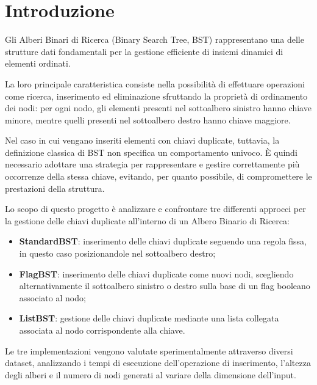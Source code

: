 \documentclass[a4paper,12pt]{article}
\begin{document}
\tableofcontents

\newpage

\section{Introduzione}

Gli Alberi Binari di Ricerca (Binary Search Tree, BST) rappresentano una delle strutture dati fondamentali per la gestione efficiente di insiemi dinamici di elementi ordinati.

La loro principale caratteristica consiste nella possibilità di effettuare operazioni come ricerca, inserimento ed eliminazione sfruttando la proprietà di ordinamento dei nodi: per ogni nodo, gli elementi presenti nel sottoalbero sinistro hanno chiave minore, mentre quelli presenti nel sottoalbero destro hanno chiave maggiore.

Nel caso in cui vengano inseriti elementi con chiavi duplicate, tuttavia, la definizione classica di BST non specifica un comportamento univoco. È quindi necessario adottare una strategia per rappresentare e gestire correttamente più occorrenze della stessa chiave, evitando, per quanto possibile, di compromettere le prestazioni della struttura.

Lo scopo di questo progetto è analizzare e confrontare tre differenti approcci per la gestione delle chiavi duplicate all'interno di un Albero Binario di Ricerca:

\begin{itemize}

    \item \textbf{StandardBST}: inserimento delle chiavi duplicate seguendo una regola fissa, in questo caso posizionandole nel sottoalbero destro;

    \item \textbf{FlagBST}: inserimento delle chiavi duplicate come nuovi nodi, scegliendo alternativamente il sottoalbero sinistro o destro sulla base di un flag booleano associato al nodo;

    \item \textbf{ListBST}: gestione delle chiavi duplicate mediante una lista collegata associata al nodo corrispondente alla chiave.

\end{itemize}

Le tre implementazioni vengono valutate sperimentalmente attraverso diversi dataset, analizzando i tempi di esecuzione dell'operazione di inserimento, l'altezza degli alberi e il numero di nodi generati al variare della dimensione dell'input.
\end{document}
